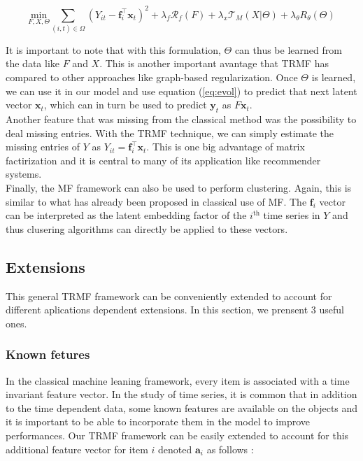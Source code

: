 \documentclass{article}
\begin{document}
\begin{equation}
\underset{F,X,\Theta}{\text{min}} \sum_{(i,t) \in \Omega} (Y_{it} - \mathbf{f}_i^\top\mathbf{x}_t)^2 + \lambda_f \mathcal{R}_f(F) + \lambda_x \mathcal{T}_M(X | \Theta) + \lambda_{\theta} R_{\theta}(\Theta)
\label{eq:model_theta}
\end{equation}

It is important to note that with this formulation, $\Theta$ can thus be learned from the data like $F$ and $X$. This is another important avantage that TRMF has compared to other approaches like graph-based regularization.
Once $\Theta$ is learned, we can use it in our model and use equation (\ref{eq:evol}) to predict that next latent vector $\mathbf{x}_t$, which can in turn be used to predict $\mathbf{y}_t$ as $F\mathbf{x}_t$. \\
Another feature that was missing from the classical method was the possibility to deal missing entries. With the TRMF technique, we can simply estimate the missing entries of $Y$ as $Y_{it} = \mathbf{f}_i^\top\mathbf{x}_t$.
This is one big advantage of matrix factirization and it is central to many of its application like recommender systems. \\
Finally, the MF framework can also be used to perform clustering. Again, this is similar to what has already been proposed in classical use of MF. The $\mathbf{f}_i$ vector can be interpreted as the latent embedding factor of the $i^\text{th}$ time series in $Y$ and thus clusering algorithms can directly be applied to these vectors.

\subsection*{Extensions}
This general TRMF framework can be conveniently extended to account for different aplications dependent extensions. In this section, we prensent $3$ useful ones.

\subsubsection*{Known fetures}
In the classical machine leaning framework, every item is associated with a time invariant feature vector. In the study of time series, it is common that in addition to the time dependent data, some known features are available on the objects and it is important to be able to incorporate them in the model to improve performances. Our TRMF framework can be easily extended to account for this additional feature vector for item $i$ denoted $\mathbf{a}_i$ as follows :
\end{document}
